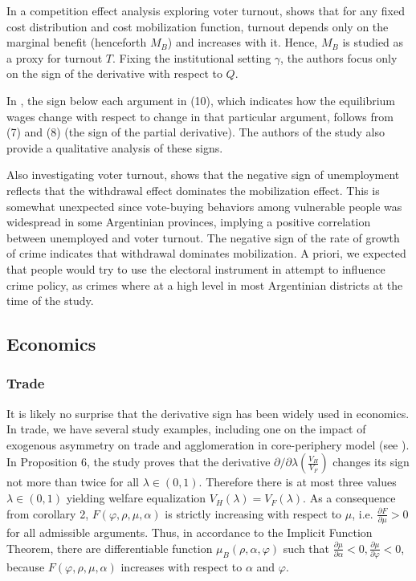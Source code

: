 \documentclass[11pt]{book}
\begin{document}
In a competition effect analysis exploring voter turnout, \cite{herrera2016turnout} shows that
for any fixed cost distribution and cost mobilization function, turnout
depends only on the marginal benefit (henceforth $M_{B}$) and increases
with it. Hence, $M_{B}$ is studied as a proxy for turnout $T$. Fixing
the institutional setting $\gamma$, the authors focus only on the
sign of the derivative with respect to $Q$.

In \cite{acharyya2017asymmetric}, the sign below each argument in
(10), which indicates how the equilibrium wages change with respect
to change in that particular argument, follows from (7) and (8) (the
sign of the partial derivative). The authors of the study also provide a qualitative analysis
of these signs.

Also investigating voter turnout, \cite{justo2018liii} shows that the negative sign of unemployment reflects
that the withdrawal effect dominates the mobilization effect. This is
somewhat unexpected since vote-buying behaviors among vulnerable people was widespread
in some Argentinian provinces, implying a positive correlation between
unemployed and voter turnout. The negative sign
of the rate of growth of crime indicates that
withdrawal dominates mobilization. A priori, we expected that people
would try to use the electoral instrument in attempt to influence crime policy, as crimes where at a high level in most Argentinian districts at the time of the study.


\subsection{Economics}


\subsubsection{Trade}

It is likely no surprise that the derivative sign has been widely used in economics. In trade, we have several study examples, including one on the impact of exogenous asymmetry on trade and agglomeration
in core-periphery model (see \cite{sidorov2011impact}). In Proposition 6, the study proves that the derivative
$\partial/\partial\lambda\left(\frac{V_{H}}{V_{F}}\right)$ changes
its sign not more than twice for all $\lambda\in(0,1)$. Therefore
there is at most three values $\lambda\in(0,1)$ yielding welfare
equalization $V_{H}\left(\lambda\right)=V_{F}\left(\lambda\right)$.
As a consequence from corollary 2, $F\left(\varphi,\rho,\mu,\alpha\right)$
is strictly increasing with respect to $\mu$, i.e. $\frac{\partial F}{\partial\mu}>0$
for all admissible arguments. Thus, in accordance to the Implicit Function Theorem,
there are differentiable function $\mu_{B}\left(\rho,\alpha,\varphi\right)$
such that $\frac{\partial\mu}{\partial\alpha}<0,\frac{\partial\mu}{\partial\varphi}<0$,
because $F\left(\varphi,\rho,\mu,\alpha\right)$ increases with respect
to $\alpha$ and $\varphi$.
\end{document}
